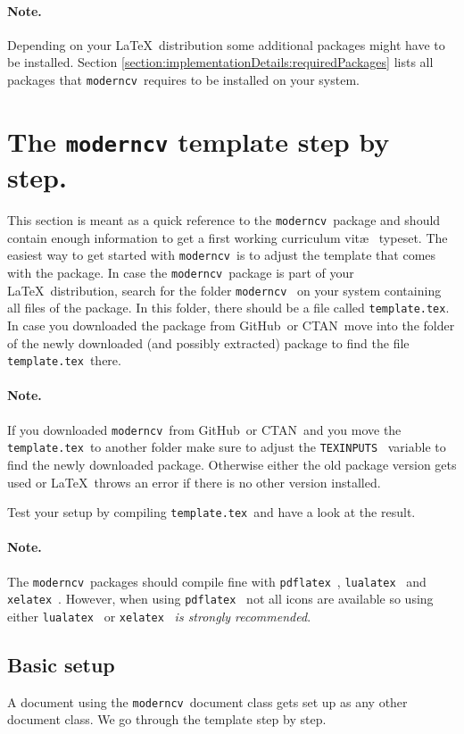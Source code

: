 \documentclass[a4paper,11pt]{article}
\newcommand{\code}[1]{\lstinline!#1!}
\newcommand{\Code}[1]{\lstinline!#1!~} %
\newcommand{\Moderncv}{\Code{moderncv}}
\newcommand{\Github}{GitHub~}
\newcommand{\Ctan}{CTAN~}
\newcommand{\cvtemplate}{\code{template.tex}}
\newcommand{\Cvtemplate}{\code{template.tex}~}
\begin{document}
\paragraph{Note.} Depending on your \LaTeX\ distribution some additional packages might have to be installed.
Section \ref{section:implementationDetails:requiredPackages} lists all packages that \Moderncv requires to be installed on your system.

\section{The \texttt{moderncv} template step by step.}
This section is meant as a quick reference to the \Moderncv package and should contain enough information
to get a first working curriculum vit\ae~ typeset.
\label{section:moderncvTemplate}
The easiest way to get started with \Moderncv is to adjust the template that comes with the package.
In case the \Moderncv package is part of your \LaTeX\ distribution, search for the folder \Moderncv
on your system containing all files of the package.
In this folder, there should be a file called \cvtemplate.
In case you downloaded the package from \Github or \Ctan move into the folder of the newly downloaded (and possibly extracted) package to
find the file \Cvtemplate there.

\paragraph{Note.} If you downloaded \Moderncv from \Github or \Ctan and you move the \Cvtemplate to another folder make sure to adjust the \Code{TEXINPUTS} variable to find the newly downloaded package.
Otherwise either the old package version gets used or \LaTeX\ throws an error if there is no other version installed.

Test your setup by compiling \Cvtemplate and have a look at the result.

\paragraph{Note.} The \Moderncv packages should compile fine with \Code{pdflatex}, \Code{lualatex} and \Code{xelatex}. However, when using \Code{pdflatex} not all icons are available so using either
\Code{lualatex} or \Code{xelatex} \emph{is strongly recommended}.

\subsection{Basic setup}
A document using the \Moderncv document class gets set up as any other document class. We go through the template step by step.
\end{document}
